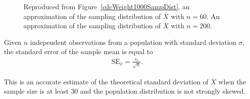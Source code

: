 \begin{figure}[h!]
	\centering
	\caption{ Reproduced from Figure~\ref{cdcWeight1000SampDist}, an approximation of the sampling distribution of $\overline{X}$ with $n = 60$.  An approximation of the sampling distribution of $\overline{X}$ with $n = 200$.}
	\label{cdcSamplingVariabilityComparison}
\end{figure}


\begin{termBox}{
		Given $n$ independent observations from a population with standard deviation $\sigma$, the standard error of the sample mean is equal to \vspace{-1mm}
		\begin{align*}
          \text{SE}_{\overline{x}} = \frac{s_x}{\sqrt{n}}.
		\label{seOfXBar}
		\end{align*}\vspace{-3mm}%
		
        This is an accurate estimate of the theoretical standard deviation of $\overline{X}$ when the sample size is at least 30 and the population distribution is not strongly skewed.}
\end{termBox}

